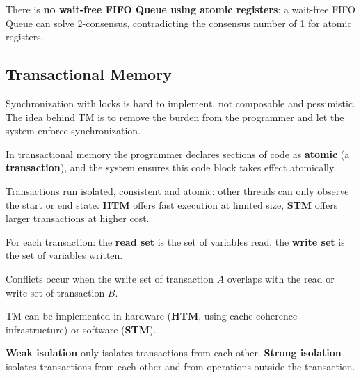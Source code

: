 \begin{remark}
There is \textbf{no wait-free FIFO Queue using atomic registers}: a wait-free FIFO Queue can solve 2-consensus, contradicting the consensus number of 1 for atomic registers.
\end{remark}

\subsection{Transactional Memory}

\begin{remark}
Synchronization with locks is hard to implement, not composable and pessimistic. The idea behind TM is to remove the burden from the programmer and let the system enforce synchronization.
\end{remark}

\begin{definition}
In transactional memory the programmer declares sections of code as \textbf{atomic} (a \textbf{transaction}), and the system ensures this code block takes effect atomically.
\end{definition}

\begin{lemma}
Transactions run isolated, consistent and atomic: other threads can only observe the start or end state. \textbf{HTM} offers fast execution at limited size, \textbf{STM} offers larger transactions at higher cost.
\end{lemma}

\begin{definition}
For each transaction: the \textbf{read set} is the set of variables read, the \textbf{write set} is the set of variables written.
\end{definition}

\begin{remark}
Conflicts occur when the write set of transaction $A$ overlaps with the read or write set of transaction $B$.
\end{remark}

\begin{remark}
TM can be implemented in hardware (\textbf{HTM}, using cache coherence infrastructure) or software (\textbf{STM}).
\end{remark}

\begin{definition}
\textbf{Weak isolation} only isolates transactions from each other.
\textbf{Strong isolation} isolates transactions from each other and from operations outside the transaction.
\end{definition}

